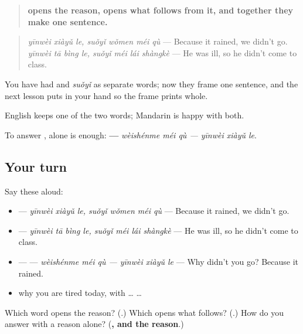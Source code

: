 \begin{grammarlens}[title={Grammar Lens: \zh{因为} … \zh{所以} …, a reason and what follows}]
\begin{quote}
\textbf{ opens the reason,  opens what follows from it, and together they make one sentence.}
\end{quote}

\begin{quote}
\textbf{ } \emph{yīnwèi xiàyǔ le, suǒyǐ wǒmen méi qù} — Because it rained, we didn't go. \textbf{ } \emph{yīnwèi tā bìng le, suǒyǐ méi lái shàngkè} — He was ill, so he didn't come to class.
\end{quote}

You have had  and \emph{suǒyǐ} as separate words; now they frame one sentence, and the next lesson puts  in your hand so the frame prints whole.

English keeps one of the two words; Mandarin is happy with both.

To answer ,  alone is enough: \textbf{ — } \emph{wèishénme méi qù — yīnwèi xiàyǔ le}.
\end{grammarlens}

\subsection*{Your turn}
Say these aloud:

\begin{itemize}
\raggedright
  \item {}  — \emph{yīnwèi xiàyǔ le, suǒyǐ wǒmen méi qù} — Because it rained, we didn't go.
  \item {}  — \emph{yīnwèi tā bìng le, suǒyǐ méi lái shàngkè} — He was ill, so he didn't come to class.
  \item {} —  — \emph{wèishénme méi qù — yīnwèi xiàyǔ le} — Why didn't you go? Because it rained.
  \item why you are tired today, with  …  …
\end{itemize}

\begin{tcolorbox}[breakable,colback=teal!4,colframe=teal!35!black,title={Before you move on}]
Which word opens the reason? (\textbf{}.) Which opens what follows? (\textbf{}.) How do you answer  with a reason alone? (\textbf{, and the reason}.)
\end{tcolorbox}
